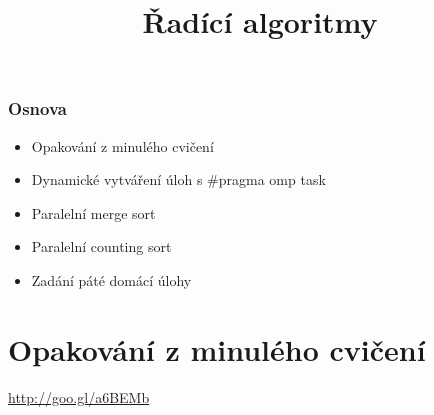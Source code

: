 \documentclass[usenames,dvipsnames,9pt]{beamer}
\title{Řadící algoritmy}
\date{}
\institute{B4B36PDV -- Paralelní a distribuované výpočty}
\begin{document}
\maketitle

\begin{frame}
  \frametitle{Osnova}
  \begin{itemize}
    \item Opakování z minulého cvičení\\[1.5em]
    \item Dynamické vytváření úloh s \#pragma omp task
    \item Paralelní merge sort
    \item Paralelní counting sort\\[1.5em]
    \item Zadání páté domácí úlohy
  \end{itemize}
\end{frame}


\section{Opakování z minulého cvičení}

\begin{frame}[standout]
  \Huge
  \url{http://goo.gl/a6BEMb}
\end{frame}
\end{document}
